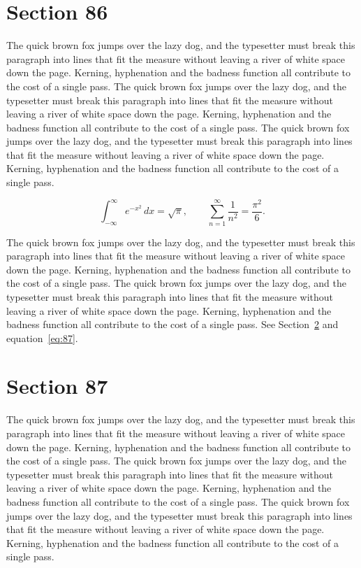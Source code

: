 \documentclass{article}
\begin{document}
\section{Section 86}
\label{sec:86}
The quick brown fox jumps over the lazy dog, and the typesetter must break this paragraph into lines that fit the measure without leaving a river of white space down the page. Kerning, hyphenation and the badness function all contribute to the cost of a single pass. The quick brown fox jumps over the lazy dog, and the typesetter must break this paragraph into lines that fit the measure without leaving a river of white space down the page. Kerning, hyphenation and the badness function all contribute to the cost of a single pass. The quick brown fox jumps over the lazy dog, and the typesetter must break this paragraph into lines that fit the measure without leaving a river of white space down the page. Kerning, hyphenation and the badness function all contribute to the cost of a single pass. 

\begin{equation}\label{eq:86}
\int_{-\infty}^{\infty} e^{-x^{2}}\,dx = \sqrt{\pi}, \qquad
\sum_{n=1}^{\infty} \frac{1}{n^{2}} = \frac{\pi^{2}}{6}.
\end{equation}

The quick brown fox jumps over the lazy dog, and the typesetter must break this paragraph into lines that fit the measure without leaving a river of white space down the page. Kerning, hyphenation and the badness function all contribute to the cost of a single pass. The quick brown fox jumps over the lazy dog, and the typesetter must break this paragraph into lines that fit the measure without leaving a river of white space down the page. Kerning, hyphenation and the badness function all contribute to the cost of a single pass. 
See Section~\ref{sec:87} and equation~\eqref{eq:87}.
\section{Section 87}
\label{sec:87}
The quick brown fox jumps over the lazy dog, and the typesetter must break this paragraph into lines that fit the measure without leaving a river of white space down the page. Kerning, hyphenation and the badness function all contribute to the cost of a single pass. The quick brown fox jumps over the lazy dog, and the typesetter must break this paragraph into lines that fit the measure without leaving a river of white space down the page. Kerning, hyphenation and the badness function all contribute to the cost of a single pass. The quick brown fox jumps over the lazy dog, and the typesetter must break this paragraph into lines that fit the measure without leaving a river of white space down the page. Kerning, hyphenation and the badness function all contribute to the cost of a single pass. 
\end{document}
